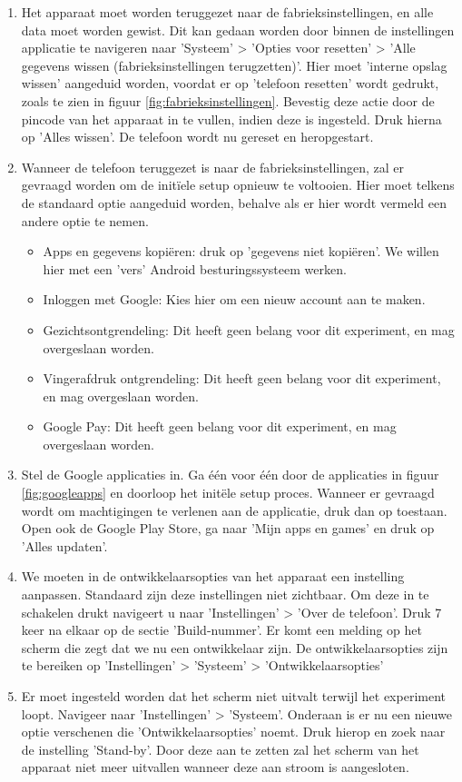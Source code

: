 \begin{enumerate}
    \item 
    \label{factoryreset}
    Het apparaat moet worden teruggezet naar de fabrieksinstellingen, en alle data moet worden gewist. Dit kan gedaan worden door binnen de instellingen applicatie te navigeren naar 'Systeem' > 'Opties voor resetten' > 'Alle gegevens wissen (fabrieksinstellingen terugzetten)'. Hier moet 'interne opslag wissen' aangeduid worden, voordat er op 'telefoon resetten' wordt gedrukt, zoals te zien in figuur \ref{fig:fabrieksinstellingen}. Bevestig deze actie door de pincode van het apparaat in te vullen, indien deze is ingesteld. Druk hierna op 'Alles wissen'. De telefoon wordt nu gereset en heropgestart.
    \item 
    \label{initialsetup}
    Wanneer de telefoon teruggezet is naar de fabrieksinstellingen, zal er gevraagd worden om de initïele setup opnieuw te voltooien. Hier moet telkens de standaard optie aangeduid worden, behalve als er hier wordt vermeld een andere optie te nemen.
    \begin{itemize}
        \item Apps en gegevens kopiëren: druk op 'gegevens niet kopiëren'. We willen hier met een 'vers' Android besturingssysteem werken.
        \item Inloggen met Google: Kies hier om een nieuw account aan te maken.
        \item Gezichtsontgrendeling: Dit heeft geen belang voor dit experiment, en mag overgeslaan worden.
        \item Vingerafdruk ontgrendeling: Dit heeft geen belang voor dit experiment, en mag overgeslaan worden.
        \item Google Pay: Dit heeft geen belang voor dit experiment, en mag overgeslaan worden.
    \end{itemize}
    \item 
    \label{setupgoogleapps}
    Stel de Google applicaties in. Ga één voor één door de applicaties in figuur \ref{fig:googleapps} en doorloop  het initële setup proces. Wanneer er gevraagd wordt om machtigingen te verlenen aan de applicatie, druk dan op toestaan. Open ook de Google Play Store, ga naar 'Mijn apps en games' en druk op 'Alles updaten'.
    \item 
    \label{developersettings}
    We moeten in de ontwikkelaarsopties van het apparaat een instelling aanpassen. Standaard zijn deze instellingen niet zichtbaar. Om deze in te schakelen drukt navigeert u naar 'Instellingen' > 'Over de telefoon'. Druk 7 keer na elkaar op de sectie 'Build-nummer'. Er komt een melding op het scherm die zegt dat we nu een ontwikkelaar zijn. De ontwikkelaarsopties zijn te bereiken op 'Instellingen' > 'Systeem' > 'Ontwikkelaarsopties'
    \item 
    \label{disablesleep}
    Er moet ingesteld worden dat het scherm niet uitvalt terwijl het experiment loopt. Navigeer naar 'Instellingen' > 'Systeem'. Onderaan is er nu een nieuwe optie verschenen die 'Ontwikkelaarsopties' noemt. Druk hierop en zoek naar de instelling 'Stand-by'. Door deze aan te zetten zal het scherm van het apparaat niet meer uitvallen wanneer deze aan stroom is aangesloten.
\end{enumerate}

